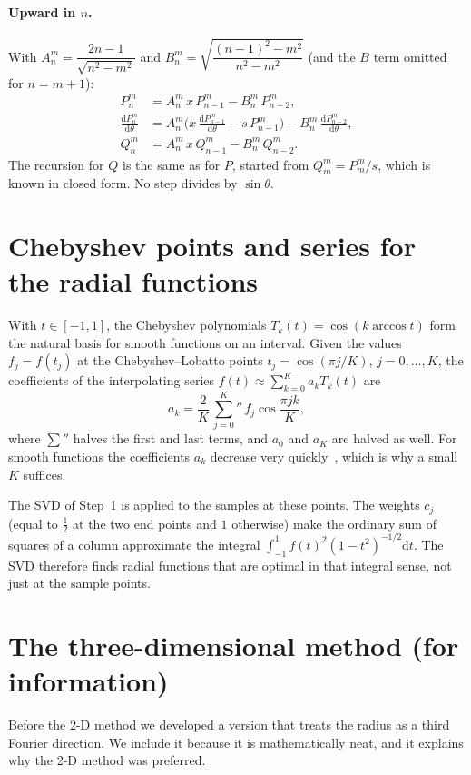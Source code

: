 \documentclass[11pt,a4paper]{article}
\theoremstyle{definition}
\newcommand{\dd}{\mathrm{d}}
\begin{document}
\paragraph{Upward in $n$.} With $A_n^m=\dfrac{2n-1}{\sqrt{n^2-m^2}}$ and $B_n^m=\sqrt{\dfrac{(n-1)^2-m^2}{n^2-m^2}}$ (and the $B$ term omitted for $n=m+1$):
\begin{align*}
P_n^m&=A_n^m\,x\,P_{n-1}^m-B_n^m\,P_{n-2}^m,\\
\frac{\dd P_n^m}{\dd\theta}&=A_n^m\Big(x\,\frac{\dd P_{n-1}^m}{\dd\theta}-s\,P_{n-1}^m\Big)-B_n^m\,\frac{\dd P_{n-2}^m}{\dd\theta},\\
Q_n^m&=A_n^m\,x\,Q_{n-1}^m-B_n^m\,Q_{n-2}^m.
\end{align*}
The recursion for $Q$ is the same as for $P$, started from $Q_m^m=P_m^m/s$, which is known in closed form. No step divides by $\sin\theta$.

\section{Chebyshev points and series for the radial functions}\label{app:radial}
With $t\in[-1,1]$, the Chebyshev polynomials $T_k(t)=\cos(k\arccos t)$ form the natural basis for smooth functions on an interval. Given the values
$f_j=f(t_j)$ at the Chebyshev--Lobatto points $t_j=\cos(\pi j/K)$, $j=0,\dots,K$, the coefficients of the interpolating series
$f(t)\approx\sum_{k=0}^{K}a_kT_k(t)$ are
\[
a_k=\frac{2}{K}\,{\sum_{j=0}^{K}}{}''\,f_j\cos\frac{\pi jk}{K},
\]
where $\sum''$ halves the first and last terms, and $a_0$ and $a_K$ are halved as well. For smooth functions the coefficients $a_k$ decrease very
quickly~\cite{trefethen2013}, which is why a small $K$ suffices.

The SVD of Step~1 is applied to the samples at these points. The weights $c_j$ (equal to $\tfrac12$ at the two end points and $1$ otherwise) make the
ordinary sum of squares of a column approximate the integral $\int_{-1}^{1}f(t)^2(1-t^2)^{-1/2}\dd t$. The SVD therefore finds radial functions that are
optimal in that integral sense, not just at the sample points.

\section{The three-dimensional method (for information)}\label{app:3d}
Before the 2-D method we developed a version that treats the radius as a third Fourier direction. We include it because it is mathematically
neat, and it explains why the 2-D method was preferred.
\end{document}
